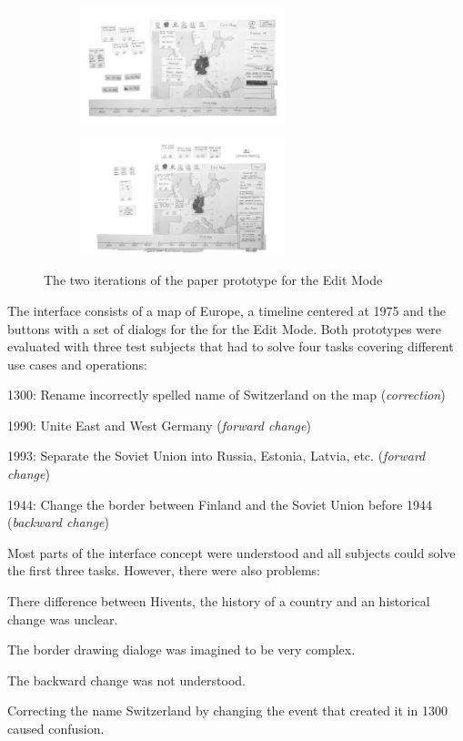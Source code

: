 \begin{figure}[H]
\centering
\begin{subfigure}{.5\textwidth}
  \centering
  \includegraphics[width=225px]{graphics/development/design_process/paper_prototype_1.png}
\end{subfigure}%
\begin{subfigure}{.5\textwidth}
  \centering
  \includegraphics[width=225px]{graphics/development/design_process/paper_prototype_2.png}
\end{subfigure}
\caption{The two iterations of the paper prototype for the Edit Mode}
\label{fig:paper_prototypes}
\end{figure}

The interface consists of a map of Europe, a timeline centered at 1975 and the buttons with a set of dialogs for the for the Edit Mode. Both prototypes were evaluated with three test subjects that had to solve four tasks covering different use cases and operations:
\begin{compactenum}
  \item 1300: Rename incorrectly spelled name of Switzerland on the map (\emph{correction})
  \item 1990: Unite East and West Germany (\emph{forward change})
  \item 1993: Separate the Soviet Union into Russia, Estonia, Latvia, etc. (\emph{forward change})
  \item 1944: Change the border between Finland and the Soviet Union before 1944 (\emph{backward change})
\end{compactenum}

Most parts of the interface concept were understood and all subjects could solve the first three tasks. However, there were also problems:

\begin{compactenum}
  \item There difference between Hivents, the history of a country and an historical change was unclear.
  \item The border drawing dialoge was imagined to be very complex.
  \item The backward change was not understood.
  \item Correcting the name Switzerland by changing the event that created it in 1300 caused confusion.
\end{compactenum}

